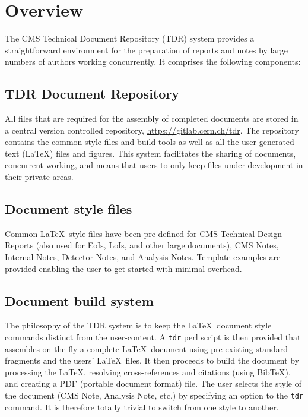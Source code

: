 \section{Overview}


The CMS Technical Document Repository (TDR) system provides a straightforward
environment for the preparation of reports and notes by
large numbers of authors working concurrently.
It comprises the following components:
%
\subsection{TDR Document Repository}

All files that are required for the assembly of completed documents
are stored in a central version controlled repository, \href{CMS tdr GitLab repository}{https://gitlab.cern.ch/tdr}.
The repository contains the common style files and build tools as well
as all the user-generated text (\LaTeX) files and figures.
This system facilitates the sharing of documents, concurrent working, and
means that users to only keep files under development in their private areas.


\subsection{Document style files}
%
Common \LaTeX\ style files have been pre-defined for CMS Technical Design Reports
(also used for EoIs, LoIs, and other large documents), CMS Notes, Internal Notes, Detector Notes, and
Analysis Notes.
Template examples are provided enabling the user to get started
with minimal overhead.


\subsection{Document build system}
%
The philosophy of the TDR system is to keep the \LaTeX\ document style
commands distinct from the user-content.
A \texttt{tdr} perl script is then provided that assembles on the fly
a complete \LaTeX\ document using pre-existing standard fragments
and the users' \LaTeX\ files.
It then proceeds to build the document by processing the \LaTeX,
resolving cross-references and citations (using BibTeX), and
creating a PDF (portable document format) file.
The user selects the style of the document (CMS Note, Analysis Note, etc.)
by specifying an option to the \texttt{tdr} command.
It is therefore totally trivial to switch from one style to another.

